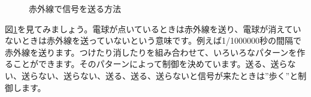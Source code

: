 \begin{figure}[H]
\centering

\caption{赤外線で信号を送る方法}
\label{ir}
\end{figure}

図\ref{ir}を見てみましょう。電球が点いているときは赤外線を送り、電球が消えていないときは赤外線を送っていないという意味です。例えば1/1000000秒の間隔で赤外線を送ります。つけたり消したりを組み合わせて、いろいろなパターンを作ることができます。そのパターンによって制御を決めています。送る、送らない、送らない、送らない、送る、送る、送らないと信号が来たときは”歩く”と制御します。
